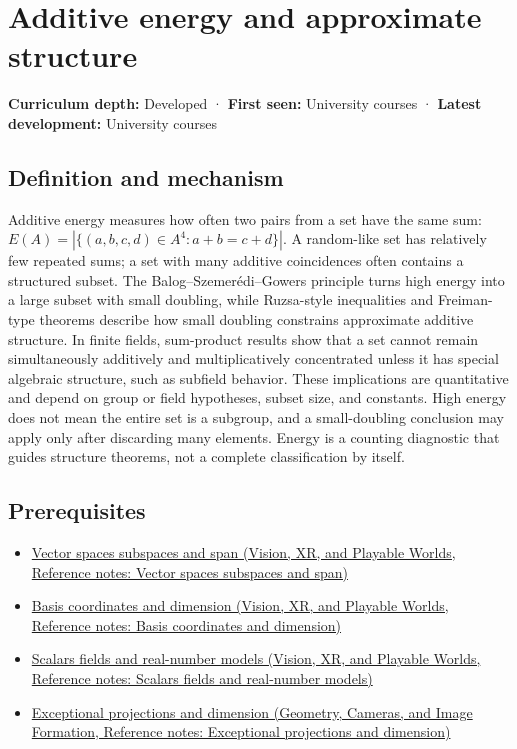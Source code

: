 \hypertarget{appendix-b0732b22e7d6}{}\label{referencestart:appendix-b0732b22e7d6}
\section{Additive energy and approximate structure}\label{appendix-b0732b22e7d6-additive-energy-and-approximate-structure}

\textbf{Curriculum depth:} Developed · \textbf{First seen:} University courses · \textbf{Latest development:} University courses

\subsection{Definition and mechanism}\label{appendix-b0732b22e7d6-definition-and-mechanism}

Additive energy measures how often two pairs from a set have the same sum: \(E(A)=|\{(a,b,c,d)\in A^4:a+b=c+d\}|\). A random-like set has relatively few repeated sums; a set with many additive coincidences often contains a structured subset. The Balog--Szemerédi--Gowers principle turns high energy into a large subset with small doubling, while Ruzsa-style inequalities and Freiman-type theorems describe how small doubling constrains approximate additive structure. In finite fields, sum-product results show that a set cannot remain simultaneously additively and multiplicatively concentrated unless it has special algebraic structure, such as subfield behavior. These implications are quantitative and depend on group or field hypotheses, subset size, and constants. High energy does not mean the entire set is a subgroup, and a small-doubling conclusion may apply only after discarding many elements. Energy is a counting diagnostic that guides structure theorems, not a complete classification by itself.

\subsection{Prerequisites}\label{appendix-b0732b22e7d6-prerequisites}

\begin{itemize}
\tightlist
\item
  \href{../07-Vision-XR-and-Playable-Worlds/main.pdf\#nameddest=appendix-173b52c063ae}{Vector spaces subspaces and span (Vision, XR, and Playable Worlds, Reference notes: Vector spaces subspaces and span)}
\item
  \href{../07-Vision-XR-and-Playable-Worlds/main.pdf\#nameddest=appendix-ce0341f7ea0d}{Basis coordinates and dimension (Vision, XR, and Playable Worlds, Reference notes: Basis coordinates and dimension)}
\item
  \href{../07-Vision-XR-and-Playable-Worlds/main.pdf\#nameddest=appendix-52051ad550fe}{Scalars fields and real-number models (Vision, XR, and Playable Worlds, Reference notes: Scalars fields and real-number models)}
\item
  \href{../03-Geometry-Cameras-and-Image-Formation/main.pdf\#nameddest=appendix-3c73f7862157}{Exceptional projections and dimension (Geometry, Cameras, and Image Formation, Reference notes: Exceptional projections and dimension)}
\end{itemize}

